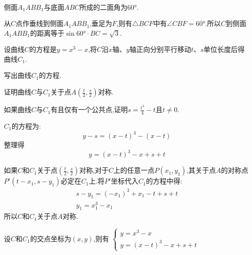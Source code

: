 \begin{questions}
\begin{solution}
\begin{penum}
\begin{align*}
			      \end{align*}
			      侧面$A_1ABB_1$与底面$ABC$所成的二面角为$\ang{60}$.
			\item
			      从$C$点作垂线到侧面$A_1ABB_1$,垂足为$F$,则有$\triangle{BCF}$中有$\angle{CBF}=\ang{60}$.所以$C$到侧面$A_1ABB_1$的距离等于$\sin{\ang{60}} \cdot BC = \sqrt{3}$.
		\end{penum}
	\end{solution}
	\question 设曲线$C$的方程是$y=x^3-x$,将$C$沿$x$轴、$y$轴正向分别平行移动$t$、$s$单位长度后得曲线$C_1$.
	\begin{penum}
		\item 写出曲线$C_1$的方程.
		\item 证明曲线$C$与$C_1$关于点$A \left( \frac{t}{2},\frac{s}{2} \right)$对称.
		\item 如果曲线$C$与$C_1$有且仅有一个公共点,证明$s=\frac{t^3}{4}-t$且$t\neq0$.

		      \begin{solution}
			      \begin{penum}
				      \item $C_1$的方程为:
				            \begin{equation*}
					            y - s = (x-t)^3 - (x-t)
				            \end{equation*}
				            整理得
				            \begin{equation*}
					            y = (x-t)^3 - x + s +t
				            \end{equation*}
				      \item
				            如果$C$和$C_1$关于点$(\frac{t}{2},\frac{s}{2})$对称,对于$C$上的任意一点$P(x_1,y_1)$,其关于点$A$的对称点$P'(t-x_1,
					            s-y_1)$必定在$C_1$上.将$P'$坐标代入$C_1$的方程中得:
				            \begin{align*}
					            s-y_1 = (-x_1)^3 +x_1 - t + s +t \\
					            y_1 = x_1^3 - x_1
				            \end{align*}
				            所以$C$和$C_1$关于点$A$对称.
				      \item 设$C$和$C_1$的交点坐标为$(x,y)$,则有
				            \begin{math}
					            \begin{cases}
						            y = x^3 - x \\
						            y = (x-t)^3 - x + s + t
					            \end{cases}
				            \end{math}


\end{penum}
\end{solution}
\end{penum}
\end{questions}
